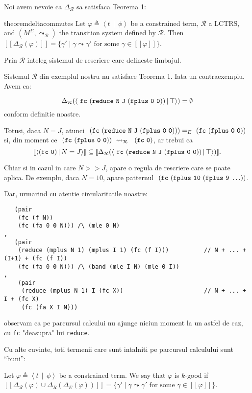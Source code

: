\documentclass[10pt,a5paper]{article}
\newcommand{\R}{\mathcal{R}}
\newcommand{\eqbydef}{\triangleq}
\newcommand{\tsem}[1]{[\![{#1}]\!]}
\newcommand{\gtran}[1]{\leadsto_{#1}}
\newcommand{\lbrbrak}{\left<}
\newcommand{\rbrbrak}{\right>}
\newcommand{\ct}[2]{\ensuremath{\lbrbrak{#1}\,\middle|\,{#2}\rbrbrak}}
\newcommand{\True}{\top}
\begin{document}
Noi avem nevoie ca $\Delta_\R$ sa satisfaca Teorema 1:

\begin{restatable}{theorem}{deltacommutes}
\label{th:der}
%
Let $\varphi \eqbydef \ct{t}{\phi}$ be a constrained term, $\R$ a
LCTRS, and $(M^\Sigma,\gtran{\R})$ the transition system defined by
$\R$.  Then
$\tsem{\Delta_\R(\varphi)} = \{\gamma' \mid \gamma \gtran{} \gamma'
\textrm{~for~some~}\gamma \in \tsem{\varphi}\}$.
\end{restatable}

Prin $\R$ inteleg sistemul de rescriere care defineste limbajul.

Sistemul $\R$ din exemplul nostru nu satisface Teorema 1. Iata un
contraexemplu. Avem ca:

\[\Delta_{\R}(\ct{{\tt~fc~(reduce~N~J~(fplus~0~0))}}{\True}) =
  \emptyset\] conform definitie noastre.

Totusi, daca $N = J$, atunci
${\tt~(fc~(reduce~N~J~(fplus~0~0)))} =_E {\tt~(fc~(fplus~0~0))}$ si,
din moment ce ${\tt~(fc~(fplus~0~0))}~\gtran{\R}~{\tt~(fc~0)}$, ar
trebui ca
\[\tsem{\ct{{\tt (fc~0)}}{N = J}} \subseteq \tsem{\Delta_\R(\ct{{\tt~fc
        ~(reduce~N~J~(fplus~0~0))}}{\True})}.\]

Chiar si in cazul in care $N >> J$, apare o regula de rescriere care
se poate aplica. De exemplu, daca $N = 10$, apare patternul
${\tt~(fc~(fplus~10~(fplus~9~\ldots))}$.

Dar, urmarind cu atentie circularitatile noastre:

\begin{verbatim}
   (pair
    (fc (f N))
    (fc (fa 0 0 N))) /\ (mle 0 N)
,
   (pair
    (reduce (mplus N 1) (mplus I 1) (fc (f I)))          // N + ... + (I+1) + (fc (f I))
    (fc (fa 0 0 N))) /\ (band (mle I N) (mle 0 I))
,
    (pair
     (reduce (mplus N 1) I (fc X))                       // N + ... + I + (fc X)
     (fc (fa X I N)))
\end{verbatim}

observam ca pe parcursul calcului nu ajunge niciun moment la un astfel
de caz, cu {\tt fc} "deasupra" lui {\tt reduce}.

Cu alte cuvinte, toti termenii care sunt intalniti pe parcursul
calculului sunt ``buni'':

\begin{definition}
  
  Let $\varphi \eqbydef \ct{t}{\phi}$ be a constrained term. We say
  that $\varphi$ is $k$-good if
  $\tsem{\Delta_\R(\varphi) \cup \Delta_R(\Delta_{E}(\varphi))} =
  \{\gamma' \mid \gamma \gtran{} \gamma' \textrm{~for~some~}\gamma \in
  \tsem{\varphi}\}$.

\end{definition}
\end{document}
